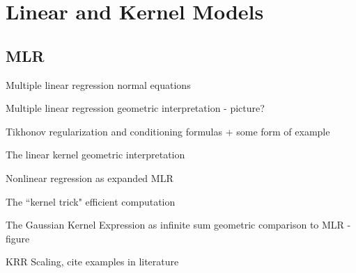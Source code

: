 \section{Linear and Kernel Models}
\subsection{MLR}
\begin{frame}{Multiple linear regression}
normal equations
\end{frame}
\begin{frame}{Multiple linear regression}
geometric interpretation - picture?
\end{frame}
\begin{frame}{Tikhonov regularization and conditioning}
formulas + some form of example
\end{frame}
\begin{frame}{The linear kernel}
geometric interpretation
\end{frame}
\begin{frame}{Nonlinear regression}
as expanded MLR
\end{frame}
\begin{frame}{The ``kernel trick"}
efficient computation 
\end{frame}
\begin{frame}{The Gaussian Kernel}
Expression as infinite sum
geometric comparison to MLR - figure 
\end{frame}
\begin{frame}{KRR}
Scaling, cite examples in literature
\end{frame}
